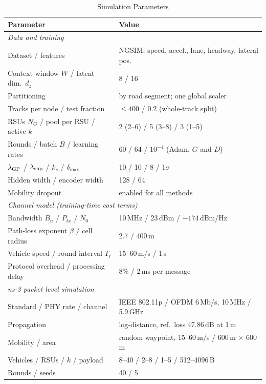 \documentclass[journal]{IEEEtran}
\begin{document}
\begin{table}[!t]
\centering
\caption{Simulation Parameters}
\label{tab:sim}
\footnotesize
\begin{tabular}{ll}
\toprule
Parameter & Value \\
\midrule
\multicolumn{2}{l}{\emph{Data and training}} \\
Dataset / features & NGSIM; speed, accel., lane, headway, lateral pos. \\
Context window $W$ / latent dim.\ $d_z$ & 8 / 16 \\
Partitioning & by road segment; one global scaler \\
Tracks per node / test fraction & $\le400$ / 0.2 (whole-track split) \\
RSUs $N_G$ / pool per RSU / active $k$ & 2 (2--6) / 5 (3--8) / 3 (1--5) \\
Rounds / batch $B$ / learning rates & 60 / 64 / $10^{-4}$ (Adam, $G$ and $D$) \\
$\lambda_{\rm GP}$ / $\lambda_{\rm sup}$ / $k_s$ / $\delta_{\max}$ & 10 / 10 / 8 / 1$\sigma$ \\
Hidden width / encoder width & 128 / 64 \\
Mobility dropout & enabled for all methods \\
\multicolumn{2}{l}{\emph{Channel model (training-time cost terms)}} \\
Bandwidth $B_n$ / $P_{tx}$ / $N_0$ & 10\,MHz / 23\,dBm / $-174$\,dBm/Hz \\
Path-loss exponent $\beta$ / cell radius & 2.7 / 400\,m \\
Vehicle speed / round interval $T_r$ & 15--60\,m/s / 1\,s \\
Protocol overhead / processing delay & 8\% / 2\,ms per message \\
\multicolumn{2}{l}{\emph{ns-3 packet-level simulation}} \\
Standard / PHY rate / channel & IEEE 802.11p / OFDM 6\,Mb/s, 10\,MHz / 5.9\,GHz \\
Propagation & log-distance, ref.\ loss 47.86\,dB at 1\,m \\
Mobility / area & random waypoint, 15--60\,m/s / 600\,m $\times$ 600\,m \\
Vehicles / RSUs / $k$ / payload & 8--40 / 2--8 / 1--5 / 512--4096\,B \\
Rounds / seeds & 40 / 5 \\
\bottomrule
\end{tabular}
\end{table}
\end{document}
